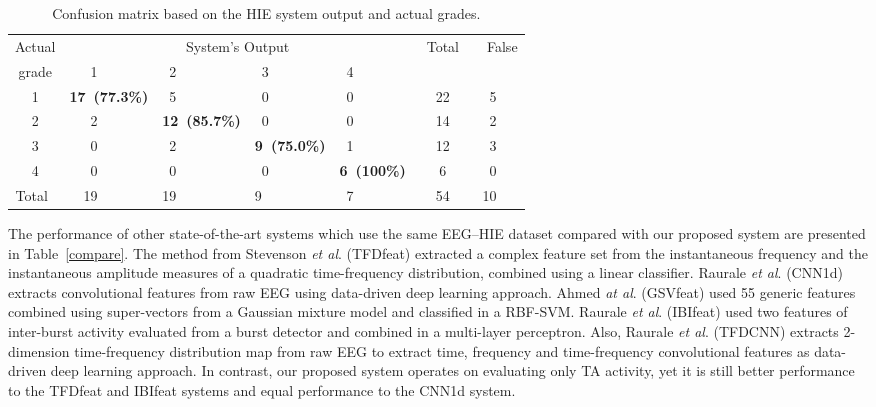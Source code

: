 \documentclass[conference]{IEEEtran}
\begin{document}
\begin{table}[!h]
\renewcommand{\arraystretch}{1.30}
\centering
\vspace{0.11cm}
\caption{Confusion matrix based on the HIE system output and actual grades.}
\label{confusion}
\setlength\tabcolsep{2.9pt}
\begin{tabular}{c l l l l c r}
\midrule 
Actual & \multicolumn{4}{c}{System's Output} & \multirow{2}{*}{~Total~} & \multirow{2}{*}{~False}\\
 \cline{2-5}
grade & ~~~1 & ~2 & ~3 & ~4 & & \\ 
\midrule
1 & {\bf 17~(77.3\%)} & ~5 & ~0 & ~0 & 22 & 5~~~\\
2 & ~~~2 & {\bf 12~(85.7\%)} & ~0 & ~0 & 14 & 2~~~\\
3 & ~~~0 & ~2 & {\bf 9~(75.0\%)} & ~1 & 12 & 3~~~\\
4 & ~~~0 & ~0 & ~0 & {\bf 6~(100\%)} & 6 & 0~~~\\
\midrule
Total~ & ~~19 & 19 & 9 & ~7 & 54 & 10~~~\\
\midrule
\end{tabular}
\vspace{-0.3cm}
\end{table}

The performance of other state-of-the-art systems which use the same EEG--HIE dataset compared with our proposed system are presented in Table~\ref{compare}. The method from Stevenson \emph{et al}. (TFDfeat) \cite{R11} extracted a complex feature set from the instantaneous frequency and the instantaneous amplitude measures of a quadratic time-frequency distribution, combined using a linear classifier. Raurale \emph{et al}. (CNN1d) \cite{raurale2020cnn} extracts convolutional features from raw EEG using data-driven deep learning approach. Ahmed \emph{at al}. (GSVfeat) \cite{R12} used 55 generic features combined using super-vectors from a Gaussian mixture model and classified in a RBF-SVM. Raurale \emph{et al}. (IBIfeat) \cite{R13} used two features of inter-burst activity evaluated from a burst detector and combined in a multi-layer perceptron. Also, Raurale \emph{et al}. (TFDCNN) \cite{jne} extracts 2-dimension time-frequency distribution map from raw EEG to extract time, frequency and time-frequency convolutional features as data-driven deep learning approach. In contrast, our proposed system operates on evaluating only TA activity, yet it is still better performance to the TFDfeat \cite{R11} and IBIfeat \cite{R13} systems and equal performance to the CNN1d \cite{raurale2020cnn} system.  
\end{document}
